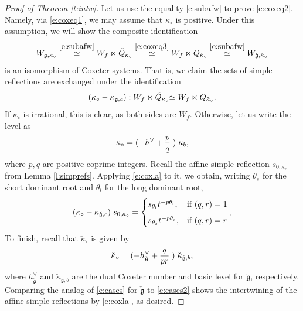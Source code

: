 \documentclass[11pt,reqno]{amsart}
\newcommand{\fg}{\mathfrak{g}}
\theoremstyle{remark}
\numberwithin{equation}{section}
\begin{document}
\begin{proof}[Proof of Theorem \ref{t:intw}]
	
	Let us use the equality \eqref{e:subafw} to prove \eqref{e:coxeq2}. Namely, 
	via \eqref{e:coxeq1}, we may assume that $\kappa_\circ$ is positive. Under 
	this assumption, we will show the composite identification 
	\[ W_{\fg, \kappa_\circ} \overset{\eqref{e:subafw}}{\simeq} W_f \ltimes 
	\check{Q}_{\kappa_\circ} \overset{\eqref{e:coxeq3}}{\simeq} 
	W_f \ltimes Q_{\check{\kappa}_\circ} \overset{\eqref{e:subafw}}{\simeq}  
	W_{\check{\fg}, 
		\check{\kappa}_\circ}
	\]
	is an isomorphism of Coxeter systems. That is, we claim the sets of simple 
	reflections are exchanged under the identification 
	\begin{equation} \label{e:coxla} (\kappa_{\circ} - \kappa_{\fg, c}): W_f 
	\ltimes 
	\check{Q}_{\kappa_\circ} {\simeq} \hspace{1mm}
	W_f \ltimes Q_{\check{\kappa}_\circ}.
	\end{equation}
	If $\kappa_\circ$ is irrational, this is clear, as both sides are $W_f$. 
	Otherwise, let us write the level as
	\begin{equation} \label{e:frac} \kappa_\circ = (-h^\vee + 
	\frac{p}{q}\hspace{1mm})\hspace{1mm}\kappa_b, 
	\end{equation}
where $p, q$ are positive coprime integers. Recall the affine simple reflection 
$s_{0, \kappa_{\circ}}$ from Lemma \ref{l:simprefs}. Applying \eqref{e:coxla} 
to it, we obtain, 
	writing $\theta_s$ for the short dominant root and $\theta_l$ for the long 
	dominant root, 
	\begin{equation} \label{e:cases2} (\kappa_\circ - \kappa_{\check{\fg}, 
		c})\hspace{1mm} s_{0, \kappa_\circ} = \begin{cases} 
	s_{\theta_l} t^{-p 
		\theta_l }, & \text{if } (q, r) = 1 \\[2mm] s_{\theta_s} 
	t^{-p 
		\theta_s }, & \text{if } (q, r) = r \end{cases},
	\end{equation}
	To finish, recall that $\check{\kappa}_\circ$ is 
	given by 
	\[ \check{\kappa}_\circ = (-h^\vee_{\check{\fg}} + \frac{q}{pr} 
	\hspace{1mm} ) \hspace{1mm} \check{\kappa}_{\check{\fg},b}, 
	\]
	where $h^\vee_{\check{\fg}}$ and $\check{\kappa}_{\check{\fg},b}$ are the 
	dual Coxeter number and basic level for $\check{\fg}$, respectively. 
	Comparing the analog of \eqref{e:cases} for $\check{\fg}$ to 
	\eqref{e:cases2} shows the intertwining of the affine simple reflections by 
	\eqref{e:coxla}, as desired. \end{proof}
\end{document}
